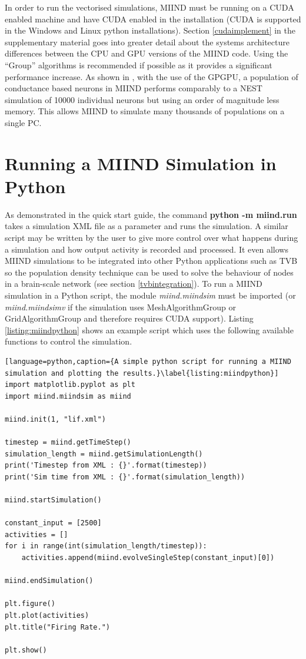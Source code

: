 \documentclass[utf8]{frontiersSCNS} %
\begin{document}
In order to run the vectorised simulations, MIIND must be running on a CUDA enabled machine and have CUDA enabled in the installation (CUDA is supported in the Windows and Linux python installations). Section \ref{cudaimplement} in the supplementary material goes into greater detail about the systems architecture differences between the CPU and GPU versions of the MIIND code. Using the ``Group'' algorithms is recommended if possible as it provides a significant performance increase. As shown in \cite{de2019computational}, with the use of the GPGPU, a population of conductance based neurons in MIIND performs comparably to a NEST simulation of 10000 individual neurons but using an order of magnitude less memory. This allows MIIND to simulate many thousands of populations on a single PC.

\section{Running a MIIND Simulation in Python}
\label{miindpython}
As demonstrated in the quick start guide, the command \textbf{python -m miind.run} takes a simulation XML file as a parameter and runs the simulation. A similar script may be written by the user to give more control over what happens during a simulation and how output activity is recorded and processed. It even allows MIIND simulations to be integrated into other Python applications such as TVB \citep{sanz2013virtual} so the population density technique can be used to solve the behaviour of nodes in a brain-scale network (see section \ref{tvbintegration}). To run a MIIND simulation in a Python script, the module \textit{miind.miindsim} must be imported (or \textit{miind.miindsimv} if the simulation uses MeshAlgorithmGroup or GridAlgorithmGroup and therefore requires CUDA support). Listing \ref{listing:miindpython} shows an example script which uses the following available functions to control the simulation.

\begin{lstlisting}[language=python,caption={A simple python script for running a MIIND simulation and plotting the results.}\label{listing:miindpython}]
import matplotlib.pyplot as plt
import miind.miindsim as miind

miind.init(1, "lif.xml")

timestep = miind.getTimeStep()
simulation_length = miind.getSimulationLength()
print('Timestep from XML : {}'.format(timestep))
print('Sim time from XML : {}'.format(simulation_length))

miind.startSimulation()

constant_input = [2500]
activities = []
for i in range(int(simulation_length/timestep)):
    activities.append(miind.evolveSingleStep(constant_input)[0])

miind.endSimulation()

plt.figure()
plt.plot(activities)
plt.title("Firing Rate.")

plt.show()
\end{lstlisting}
\end{document}
